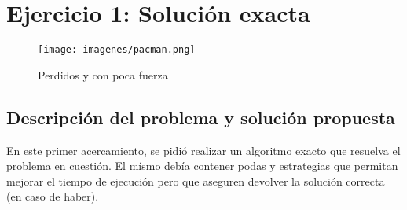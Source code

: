 \section{Ejercicio 1: Solución exacta}

  \begin{figure}[ht]
    \begin{center}
      \texttt{[image: imagenes/pacman.png]}
      \caption{Perdidos y con poca fuerza}
    \end{center}
  \end{figure}

    \subsection{Descripción del problema y solución propuesta}
        En este primer acercamiento, se pidió realizar un algoritmo exacto que resuelva el problema en cuestión. El mísmo debía contener podas y estrategias que permitan mejorar el tiempo de ejecución pero que aseguren devolver la solución correcta (en caso de haber).

